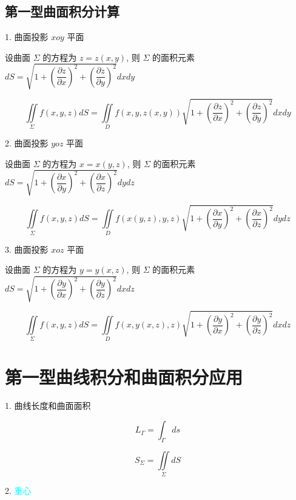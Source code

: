 \subsection{第一型曲面积分计算}
\begin{theorem}[投影法]
	1. 曲面投影 $xoy$ 平面

	设曲面 $\Sigma$ 的方程为 $z=z(x,y)$, 则 $\Sigma$ 的面积元素 $dS = \sqrt{1+\left(\dfrac{\partial z}{\partial x}\right)^{2}+\left(\dfrac{\partial z}{\partial y}\right)^{2}}dxdy$

	$$\iint\limits_{\Sigma}f(x,y,z)dS = \iint\limits_{D}f(x,y,z(x,y))\sqrt{1+\left(\dfrac{\partial z}{\partial x}\right)^{2}+\left(\dfrac{\partial z}{\partial y}\right)^{2}}dxdy$$

	2. 曲面投影 $yoz$ 平面

	设曲面 $\Sigma$ 的方程为 $x=x(y,z)$, 则 $\Sigma$ 的面积元素 $dS = \sqrt{1+\left(\dfrac{\partial x}{\partial y}\right)^{2}+\left(\dfrac{\partial x}{\partial z}\right)^{2}}dydz$

	$$\iint\limits_{\Sigma}f(x,y,z)dS = \iint\limits_{D}f(x(y,z),y,z)\sqrt{1+\left(\dfrac{\partial x}{\partial y}\right)^{2}+\left(\dfrac{\partial x}{\partial z}\right)^{2}}dydz$$

	3. 曲面投影 $xoz$ 平面

	设曲面 $\Sigma$ 的方程为 $y=y(x,z)$, 则 $\Sigma$ 的面积元素 $dS = \sqrt{1+\left(\dfrac{\partial y}{\partial x}\right)^{2}+\left(\dfrac{\partial y}{\partial z}\right)^{2}}dxdz$

	$$\iint\limits_{\Sigma}f(x,y,z)dS = \iint\limits_{D}f(x,y(x,z),z)\sqrt{1+\left(\dfrac{\partial y}{\partial x}\right)^{2}+\left(\dfrac{\partial y}{\partial z}\right)^{2}}dxdz$$

\end{theorem}
\section{第一型曲线积分和曲面积分应用}

1. \textcolor{purplec}{曲线长度和曲面面积}

\begin{theorem}[曲线弧长和曲面面积]

	$$L_{\Gamma} = \int_{\Gamma} ds$$

	$$S_{\Sigma} = \iint\limits_{\Sigma}dS$$
\end{theorem}

2. \textcolor{cyan}{重心}

